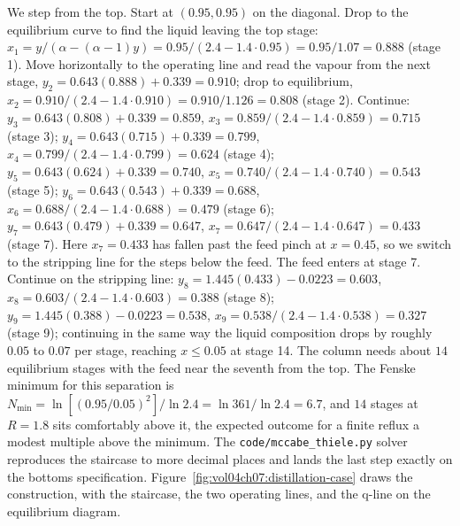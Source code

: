 We step from the top. Start at $(0.95,0.95)$ on the diagonal. Drop to
the equilibrium curve to find the liquid leaving the top stage:
$x_1 = y/(\alpha-(\alpha-1)y) = 0.95/(2.4-1.4\cdot 0.95) = 0.95/1.07 =
0.888$ (stage 1). Move horizontally to the operating line and read the
vapour from the next stage, $y_2 = 0.643(0.888)+0.339 = 0.910$; drop to
equilibrium, $x_2 = 0.910/(2.4-1.4\cdot 0.910) = 0.910/1.126 = 0.808$
(stage 2). Continue: $y_3 = 0.643(0.808)+0.339 = 0.859$, $x_3 = 0.859/
(2.4-1.4\cdot 0.859) = 0.715$ (stage 3); $y_4 = 0.643(0.715)+0.339 =
0.799$, $x_4 = 0.799/(2.4-1.4\cdot 0.799) = 0.624$ (stage 4); $y_5 =
0.643(0.624)+0.339 = 0.740$, $x_5 = 0.740/(2.4-1.4\cdot 0.740) = 0.543$
(stage 5); $y_6 = 0.643(0.543)+0.339 = 0.688$, $x_6 = 0.688/(2.4-1.4\cdot
0.688) = 0.479$ (stage 6); $y_7 = 0.643(0.479)+0.339 = 0.647$, $x_7 =
0.647/(2.4-1.4\cdot 0.647) = 0.433$ (stage 7). Here $x_7 = 0.433$ has
fallen past the feed pinch at $x = 0.45$, so we switch to the stripping
line for the steps below the feed. The feed enters at stage 7. Continue on
the stripping line: $y_8 = 1.445(0.433)-0.0223 = 0.603$, $x_8 = 0.603/
(2.4-1.4\cdot 0.603) = 0.388$ (stage 8); $y_9 = 1.445(0.388)-0.0223 =
0.538$, $x_9 = 0.538/(2.4-1.4\cdot 0.538) = 0.327$ (stage 9); continuing
in the same way the liquid composition drops by roughly $0.05$ to $0.07$
per stage, reaching $x \le 0.05$ at stage 14. The column needs about $14$
equilibrium stages with the feed near the seventh from the top. The
Fenske minimum for this separation is $N_{\min} = \ln[(0.95/0.05)^2]/
\ln 2.4 = \ln 361/\ln 2.4 = 6.7$, and $14$ stages at $R = 1.8$ sits
comfortably above it, the expected outcome for a finite reflux a modest
multiple above the minimum. The \texttt{code/mccabe\_thiele.py} solver
reproduces the staircase to more decimal places and lands the last step
exactly on the bottoms specification.
Figure~\ref{fig:vol04ch07:distillation-case} draws the construction, with
the staircase, the two operating lines, and the q-line on the
equilibrium diagram.



